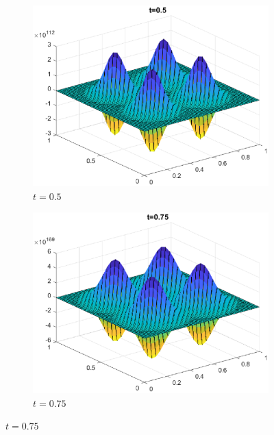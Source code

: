\documentclass[]{article}
\begin{document}
	\begin{figure}[htbp]
	\centering	
		\begin{subfigure}[b]{0.45\textwidth}
			\includegraphics[width=\textwidth]{images/h1_t2.eps}
			\caption{$t = 0.5$}
			\label{fig:image4}
		\end{subfigure}
		\hfill
		\begin{subfigure}[b]{0.45\textwidth}
			\includegraphics[width=\textwidth]{images/h1_t3.eps}
			\caption{$t = 0.75$}
			\label{fig:image5}
		\end{subfigure}
		\end{figure}
\end{document}
